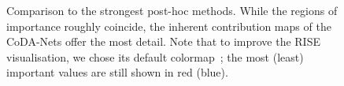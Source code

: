 \begin{figure}
\centering
{}
            \caption{\small Comparison to the strongest post-hoc methods. While the regions of importance roughly coincide, the inherent contribution maps of the CoDA-Nets offer the most detail. Note that to improve the RISE visualisation, we chose its default colormap~\cite{petsiuk2018rise}; the most (least) important values are still shown in red (blue).}
            \label{fig:comparison}
\end{figure}